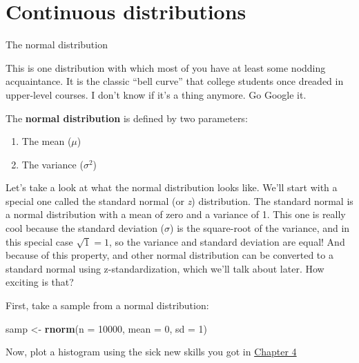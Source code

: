 \documentclass[
]{book}
\newenvironment{Shaded}{\begin{snugshade}}{\end{snugshade}}
\newcommand{\DataTypeTok}[1]{\textcolor[rgb]{0.13,0.29,0.53}{#1}}
\newcommand{\DecValTok}[1]{\textcolor[rgb]{0.00,0.00,0.81}{#1}}
\newcommand{\KeywordTok}[1]{\textcolor[rgb]{0.13,0.29,0.53}{\textbf{#1}}}
\newcommand{\NormalTok}[1]{#1}
\newcommand{\StringTok}[1]{\textcolor[rgb]{0.31,0.60,0.02}{#1}}
\begin{document}
\hypertarget{continuous-distributions}{%
\section{Continuous distributions}\label{continuous-distributions}}

The normal distribution

This is one distribution with which most of you have at least some nodding acquaintance. It is the classic ``bell curve'' that college students once dreaded in upper-level courses. I don't know if it's a thing anymore. Go Google it.

The \textbf{normal distribution} is defined by two parameters:

\begin{enumerate}
\def\labelenumi{\arabic{enumi}.}
\item
  The mean (\(\mu\))
\item
  The variance (\(\sigma^2\))
\end{enumerate}

Let's take a look at what the normal distribution looks like. We'll start with a special one called the standard normal (or \emph{z}) distribution. The standard normal is a normal distribution with a mean of zero and a variance of 1. This one is really cool because the standard deviation (\(\sigma\)) is the square-root of the variance, and in this special case \(\sqrt{1} = 1\), so the variance and standard deviation are equal! And because of this property, and other normal distribution can be converted to a standard normal using z-standardization, which we'll talk about later. How exciting is that?

First, take a sample from a normal distribution:

\begin{Shaded}
\begin{Highlighting}[]
\NormalTok{samp <-}\StringTok{ }\KeywordTok{rnorm}\NormalTok{(}\DataTypeTok{n =} \DecValTok{10000}\NormalTok{, }\DataTypeTok{mean =} \DecValTok{0}\NormalTok{, }\DataTypeTok{sd =} \DecValTok{1}\NormalTok{)}
\end{Highlighting}
\end{Shaded}

Now, plot a histogram using the sick new skills you got in \protect\hyperlink{Chapter4}{Chapter 4}
\end{document}

